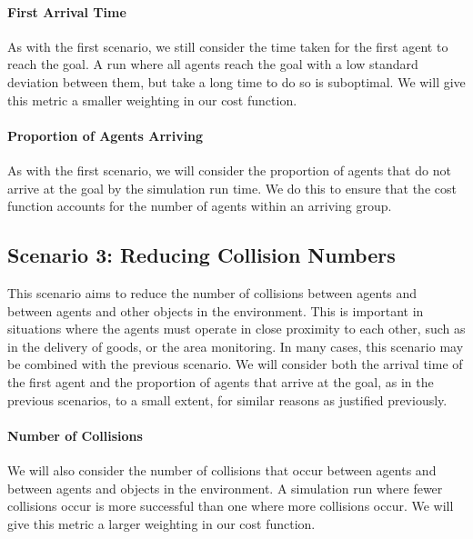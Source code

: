 \documentclass[12pt]{article}
\begin{document}
\paragraph{First Arrival Time} As with the first scenario, we still consider the time taken for the first agent to reach the goal. A run where all agents reach the goal with a low standard deviation between them, but take a long time to do so is suboptimal. We will give this metric a smaller weighting in our cost function.

\paragraph{Proportion of Agents Arriving} As with the first scenario, we will consider the proportion of agents that do not arrive at the goal by the simulation run time. We do this to ensure that the cost function accounts for the number of agents within an arriving group.

\subsection{Scenario 3: Reducing Collision Numbers}
This scenario aims to reduce the number of collisions between agents and between agents and other objects in the environment. This is important in situations where the agents must operate in close proximity to each other, such as in the delivery of goods, or the area monitoring. In many cases, this scenario may be combined with the previous scenario. We will consider both the arrival time of the first agent and the proportion of agents that arrive at the goal, as in the previous scenarios, to a small extent, for similar reasons as justified previously.

\paragraph{Number of Collisions} We will also consider the number of collisions that occur between agents and between agents and objects in the environment. A simulation run where fewer collisions occur is more successful than one where more collisions occur. We will give this metric a larger weighting in our cost function.

\newpage
\end{document}
